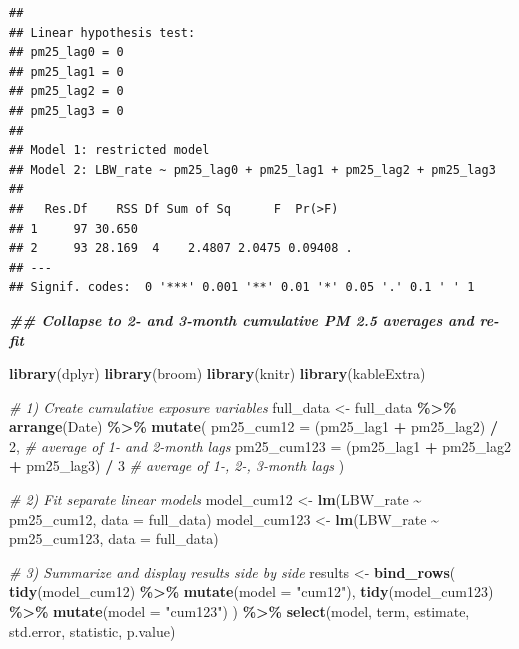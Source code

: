 \documentclass[
]{article}
\newenvironment{Shaded}{\begin{snugshade}}{\end{snugshade}}
\newcommand{\AttributeTok}[1]{\textcolor[rgb]{0.13,0.29,0.53}{#1}}
\newcommand{\CommentTok}[1]{\textcolor[rgb]{0.56,0.35,0.01}{\textit{#1}}}
\newcommand{\DecValTok}[1]{\textcolor[rgb]{0.00,0.00,0.81}{#1}}
\newcommand{\DocumentationTok}[1]{\textcolor[rgb]{0.56,0.35,0.01}{\textbf{\textit{#1}}}}
\newcommand{\FunctionTok}[1]{\textcolor[rgb]{0.13,0.29,0.53}{\textbf{#1}}}
\newcommand{\NormalTok}[1]{#1}
\newcommand{\OtherTok}[1]{\textcolor[rgb]{0.56,0.35,0.01}{#1}}
\newcommand{\SpecialCharTok}[1]{\textcolor[rgb]{0.81,0.36,0.00}{\textbf{#1}}}
\newcommand{\StringTok}[1]{\textcolor[rgb]{0.31,0.60,0.02}{#1}}
\begin{document}
\begin{verbatim}
## 
## Linear hypothesis test:
## pm25_lag0 = 0
## pm25_lag1 = 0
## pm25_lag2 = 0
## pm25_lag3 = 0
## 
## Model 1: restricted model
## Model 2: LBW_rate ~ pm25_lag0 + pm25_lag1 + pm25_lag2 + pm25_lag3
## 
##   Res.Df    RSS Df Sum of Sq      F  Pr(>F)  
## 1     97 30.650                              
## 2     93 28.169  4    2.4807 2.0475 0.09408 .
## ---
## Signif. codes:  0 '***' 0.001 '**' 0.01 '*' 0.05 '.' 0.1 ' ' 1
\end{verbatim}

\begin{Shaded}
\begin{Highlighting}[]
\DocumentationTok{\#\# Collapse to 2{-} and 3{-}month cumulative PM 2.5 averages and re{-}fit}

\FunctionTok{library}\NormalTok{(dplyr)}
\FunctionTok{library}\NormalTok{(broom)}
\FunctionTok{library}\NormalTok{(knitr)}
\FunctionTok{library}\NormalTok{(kableExtra)}

\CommentTok{\# 1) Create cumulative exposure variables}
\NormalTok{full\_data }\OtherTok{\textless{}{-}}\NormalTok{ full\_data }\SpecialCharTok{\%\textgreater{}\%}
  \FunctionTok{arrange}\NormalTok{(Date) }\SpecialCharTok{\%\textgreater{}\%}
  \FunctionTok{mutate}\NormalTok{(}
    \AttributeTok{pm25\_cum12  =}\NormalTok{ (pm25\_lag1 }\SpecialCharTok{+}\NormalTok{ pm25\_lag2) }\SpecialCharTok{/} \DecValTok{2}\NormalTok{,          }\CommentTok{\# average of 1{-} and 2{-}month lags}
    \AttributeTok{pm25\_cum123 =}\NormalTok{ (pm25\_lag1 }\SpecialCharTok{+}\NormalTok{ pm25\_lag2 }\SpecialCharTok{+}\NormalTok{ pm25\_lag3) }\SpecialCharTok{/} \DecValTok{3}  \CommentTok{\# average of 1{-}, 2{-}, 3{-}month lags}
\NormalTok{  )}

\CommentTok{\# 2) Fit separate linear models}
\NormalTok{model\_cum12  }\OtherTok{\textless{}{-}} \FunctionTok{lm}\NormalTok{(LBW\_rate }\SpecialCharTok{\textasciitilde{}}\NormalTok{ pm25\_cum12,  }\AttributeTok{data =}\NormalTok{ full\_data)}
\NormalTok{model\_cum123 }\OtherTok{\textless{}{-}} \FunctionTok{lm}\NormalTok{(LBW\_rate }\SpecialCharTok{\textasciitilde{}}\NormalTok{ pm25\_cum123, }\AttributeTok{data =}\NormalTok{ full\_data)}

\CommentTok{\# 3) Summarize and display results side by side}
\NormalTok{results }\OtherTok{\textless{}{-}} \FunctionTok{bind\_rows}\NormalTok{(}
  \FunctionTok{tidy}\NormalTok{(model\_cum12)  }\SpecialCharTok{\%\textgreater{}\%} \FunctionTok{mutate}\NormalTok{(}\AttributeTok{model =} \StringTok{"cum12"}\NormalTok{),}
  \FunctionTok{tidy}\NormalTok{(model\_cum123) }\SpecialCharTok{\%\textgreater{}\%} \FunctionTok{mutate}\NormalTok{(}\AttributeTok{model =} \StringTok{"cum123"}\NormalTok{)}
\NormalTok{) }\SpecialCharTok{\%\textgreater{}\%}
  \FunctionTok{select}\NormalTok{(model, term, estimate, std.error, statistic, p.value)}


\end{Highlighting}
\end{Shaded}
\end{document}
